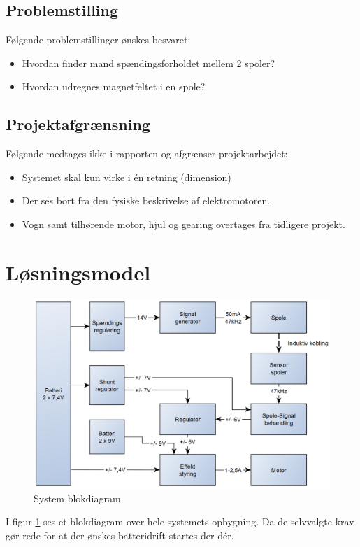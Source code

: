 \subsection{Problemstilling}
Følgende problemstillinger ønskes besvaret:
\begin{itemize}
\item Hvordan finder mand spændingsforholdet mellem 2 spoler?
\item Hvordan udregnes magnetfeltet i en spole?
\end{itemize}

\subsection{Projektafgrænsning}
Følgende medtages ikke i rapporten og afgrænser projektarbejdet:
\begin{itemize}
\item Systemet skal kun virke i én retning (dimension)
\item Der ses bort fra den fysiske beskrivelse af elektromotoren.
\item Vogn samt tilhørende motor, hjul og gearing overtages fra tidligere projekt.
\end{itemize}

\section{Løsningsmodel}
\begin{figure}[h!]
	\centering
	\includegraphics[width=.9\textwidth]{diagram/blokdiagram1.png}
	\caption{System blokdiagram.}
	\label{fig:blockdiagram1}
\end{figure}
\FloatBlock
I figur \ref{fig:blockdiagram1} ses et blokdiagram over hele systemets opbygning. Da de selvvalgte krav gør rede for at der ønskes batteridrift startes der dér. 


